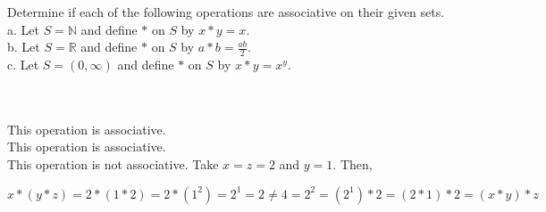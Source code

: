 Determine if each of the following operations are associative on their given sets.\\

a. Let $S=\mathbb{N}$ and define $*$ on $S$ by $x*y=x$.\\

b. Let $S=\mathbb{R}$ and define $*$ on $S$ by $a*b=\frac{ab}{2}$.\\

c. Let $S=(0,\infty)$ and define $*$ on $S$ by $x*y=x^y$.\\\\

\begin{solution}\renewcommand{\qedsymbol}{}\ \\
    This operation is associative.\\

    This operation is associative.\\

    This operation is not associative. Take $x=z=2$ and $y=1$. Then,
    
    $$x*(y*z)=2*(1*2)=2*(1^2)=2^1=2\neq4=2^2=(2^1)*2=(2*1)*2=(x*y)*z$$

\end{solution}
